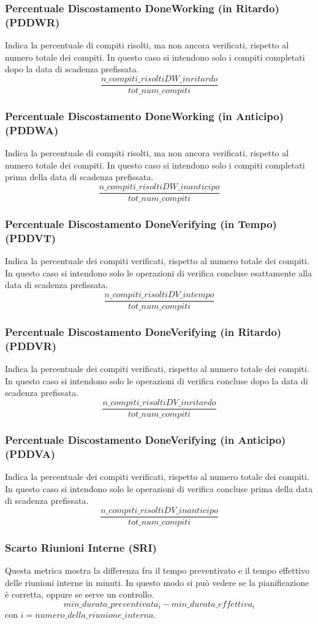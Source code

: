 \subsubsection{Percentuale Discostamento DoneWorking (in Ritardo) (PDDWR)}
Indica la percentuale di compiti risolti, ma non ancora verificati, rispetto al numero totale dei compiti. In questo caso si intendono solo i compiti completati dopo la data di scadenza prefissata.
\[\frac{n\_compiti\_risoltiDW\_inritardo}{tot\_num\_compiti}\]
\subsubsection{Percentuale Discostamento DoneWorking (in Anticipo) (PDDWA)}
Indica la percentuale di compiti risolti, ma non ancora verificati, rispetto al numero totale dei compiti. In questo caso si intendono solo i compiti completati prima della data di scadenza prefissata.
\[\frac{n\_compiti\_risoltiDW\_inanticipo}{tot\_num\_compiti}\]
\subsubsection{Percentuale Discostamento DoneVerifying (in Tempo) (PDDVT)}
Indica la percentuale dei compiti verificati, rispetto al numero totale dei compiti. In questo caso si intendono solo le operazioni di verifica concluse esattamente alla data di scadenza prefissata.
\[\frac{n\_compiti\_risoltiDV\_intempo}{tot\_num\_compiti}\]

\subsubsection{Percentuale Discostamento DoneVerifying (in Ritardo) (PDDVR)}
Indica la percentuale dei compiti verificati, rispetto al numero totale dei compiti. In questo caso si intendono solo le operazioni di verifica concluse dopo la data di scadenza prefissata.
\[\frac{n\_compiti\_risoltiDV\_inritardo}{tot\_num\_compiti}\]
\subsubsection{Percentuale Discostamento DoneVerifying (in Anticipo) (PDDVA)}
Indica la percentuale dei compiti verificati, rispetto al numero totale dei compiti. In questo caso si intendono solo le operazioni di verifica concluse prima della data di scadenza prefissata.
\[\frac{n\_compiti\_risoltiDV\_inanticipo}{tot\_num\_compiti}\]
\subsubsection{Scarto Riunioni Interne (SRI)}
Questa metrica mostra la differenza fra il tempo preventivato e il tempo effettivo delle riunioni interne in minuti. In questo modo si può vedere se la pianificazione è corretta, oppure se serve un controllo.
\[min\_durata\_preventivata_i-min\_durata\_effettiva_i\] 
con $i = {numero\_della\_riunione\_interna}$.
